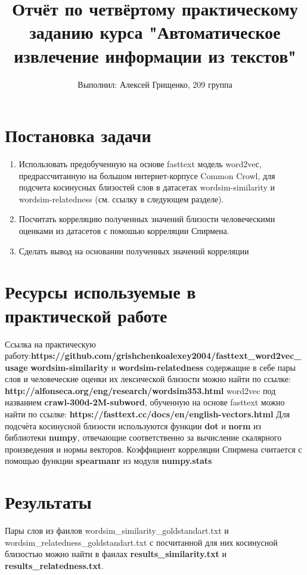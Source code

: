 \documentclass[14pt]{extreport}
\title{\textbf{Отчёт по четвёртому практическому заданию курса "Автоматическое извлечение информации из текстов"} }
\author{Выполнил: Алексей Грищенко, 209 группа}
\date{}
\begin{document}
\maketitle

\section*{Постановка задачи}
\begin{enumerate}
    \item Использовать предобученную на основе fasttext модель word2veс, предрассчитанную на большом интернет-корпусе Common Crowl, для подсчета косинусных близостей слов в датасетах wordsim-similarity и wordsim-relatedness (см. ссылку в следующем разделе).
    \item Посчитать корреляцию полученных значений близости человеческими оценками из датасетов с помошью корреляции Спирмена.
    \item Сделать вывод на основании полученных значений корреляции
\end{enumerate}

\section*{Ресурсы используемые в практической работе}
Ссылка на практическую работу:\newline \textbf{https://github.com/grishchenkoalexey2004/fasttext\_word2vec\_usage}\newline
{} \textbf{wordsim-similarity} и \textbf{wordsim-relatedness} содержащие в себе пары слов и человеческие оценки их лексической близости можно найти по ссылке: \textbf{http://alfonseca.org/eng/research/wordsim353.html}\newline
{} word2vec под названием \textbf{crawl-300d-2M-subword}, обученную на основе fasttext можно найти по ссылке: \textbf{https://fasttext.cc/docs/en/english-vectors.html}\newline
\indent Для подсчёта косинусной близости используются функции \textbf{dot} и \textbf{norm} из библиотеки \textbf{numpy}, отвечающие соответственно за вычисление скалярного произведения и нормы векторов.\newline
\indent Коэффициент корреляции Спирмена считается с помощью функции \textbf{spearmanr} из модуля \textbf{numpy.stats}


\section*{Результаты}
Пары слов из фаилов wordsim\_similarity\_goldstandart.txt и \linebreak wordsim\_relatedness\_goldstandart.txt с посчитанной для них косинусной близостью можно найти в фаилах \textbf{results\_similarity.txt} и \textbf{results\_relatedness.txt}.
\end{document}
